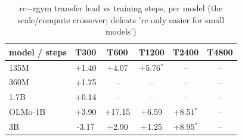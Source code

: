 \begin{table}[t]\centering
\caption{rc$-$rgym transfer lead vs training steps, per model (the scale/compute crossover; defeats 'rc only easier for small models')}\label{tab:scale_crossover_ladder}
\begin{tabular}{lccccc}
\toprule
model / steps & T300 & T600 & T1200 & T2400 & T4800 \\
\midrule
135M & +1.40 & +4.07 & +5.76$^{*}$ & -- & -- \\
360M & +1.75 & -- & -- & -- & -- \\
1.7B & +0.14 & -- & -- & -- & -- \\
OLMo-1B & +3.90 & +17.15 & +6.59 & +8.51$^{*}$ & -- \\
3B & -3.17 & +2.90 & +1.25 & +8.95$^{*}$ & -- \\
\bottomrule
\end{tabular}
\end{table}
